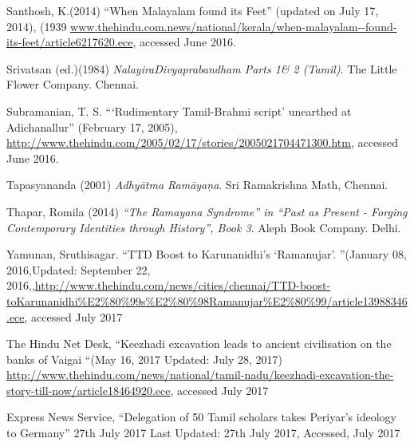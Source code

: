 \begin{thebibliography}{99}
  Santhosh, K.(2014) “When Malayalam found its Feet” (updated on July 17, 2014), (1939 \url{www.thehindu.com.news/national/kerala/when-malayalam--found-its-feet/article6217620.ece}, accessed June 2016.

  Srivatsan (ed.)(1984) \textit{NalayiraDivyaprabandham Parts 1\& 2 (Tamil)}. The Little Flower Company. Chennai.

  Subramanian, T. S. “‘Rudimentary Tamil-Brahmi script' unearthed at Adichanallur” (February 17, 2005), \url{http://www.thehindu.com/2005/02/17/stories/2005021704471300.htm}, accessed June 2016.

  Tapasyananda (2001) \textit{Adhyātma Ramāyaņa}. Sri Ramakrishna Math, Chennai.

  Thapar, Romila (2014) \textit{“The Ramayana Syndrome” in “Past as Present - Forging} \textit{Contemporary Identities through History”, Book 3}. Aleph Book Company. Delhi.

  Yamunan, Sruthisagar. “TTD Boost to Karunanidhi’s ‘Ramanujar’. ”(January 08, 2016,Updated: September 22, 2016,\url{,http://www.thehindu.com/news/cities/chennai/TTD-boost-toKarunanidhi%E2%80%99s%E2%80%98Ramanujar%E2%80%99/article13988346.ece}, accessed July 2017

  The Hindu Net Desk, “Keezhadi excavation leads to ancient civilisation on the banks of Vaigai “(May 16, 2017 Updated: July 28, 2017) \url{http://www.thehindu.com/news/national/tamil-nadu/keezhadi-excavation-the-story-till-now/article18464920.ece}, accessed July 2017

  Express News Service, “Delegation of 50 Tamil scholars takes Periyar’s ideology to Germany” 27th July 2017 Last Updated: 27th July 2017, Accessed, July 2017

 \end{thebibliography}

